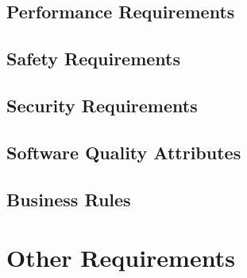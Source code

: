         \section{Performance Requirements}
        \section{Safety Requirements}
        \section{Security Requirements}
        \section{Software Quality Attributes}
        \section{Business Rules}
        
    \chapter{Other Requirements}\label{Other Requirements}




